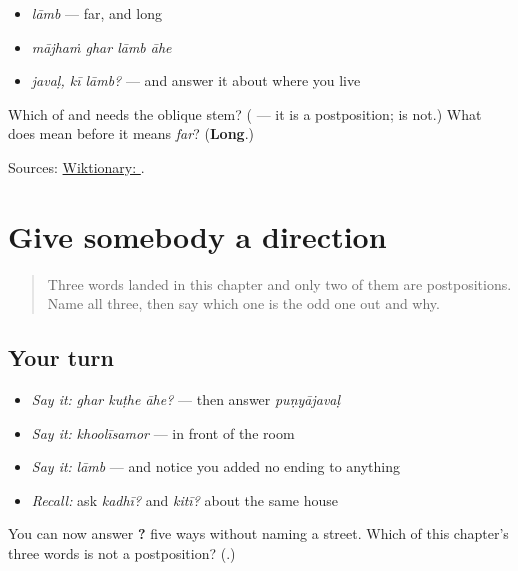 \begin{itemize}
\raggedright
  \item \emph{lāmb} — far, and long
  \item \emph{mājhaṁ ghar lāmb āhe}
  \item \emph{javaḷ, kī lāmb?} — and answer it about where you live
\end{itemize}

\begin{tcolorbox}[breakable,colback=teal!4,colframe=teal!35!black,title={Before you move on}]
Which of \textbf{} and \textbf{} needs the oblique stem? (\textbf{} — it is a postposition; \textbf{} is not.) What does \textbf{} mean before it means \emph{far}? (\textbf{Long}.)

Sources: \href{https://en.wiktionary.org/wiki/\%E0\%A4\%B2\%E0\%A4\%BE\%E0\%A4\%82\%E0\%A4\%AC}{Wiktionary: }.
\end{tcolorbox}
\section[\texorpdfstring{\mr{जवळ} · \mr{समोर} · \mr{लांब} (javaḷ · samor · lāmb)}{जवळ · समोर · लांब (javaḷ · samor · lāmb)}]{Give somebody a direction}

\label{lesson:MR-R43-how-far}



\begin{quote}
Three words landed in this chapter and only two of them are postpositions. Name all three, then say which one is the odd one out and why.
\end{quote}

\subsection*{Your turn}
\begin{itemize}
\raggedright
  \item \emph{Say it:} \emph{ghar kuṭhe āhe?} — then answer \emph{puṇyājavaḷ}
  \item \emph{Say it:} \emph{khoolīsamor} — in front of the room
  \item \emph{Say it:} \emph{lāmb} — and notice you added no ending to anything
  \item \emph{Recall:} ask \emph{kadhī?} and \emph{kitī?} about the same house
\end{itemize}

\begin{tcolorbox}[breakable,colback=teal!4,colframe=teal!35!black,title={Before you move on}]
You can now answer \textbf{?} five ways without naming a street. Which of this chapter's three words is not a postposition? (\textbf{}.)
\end{tcolorbox}

